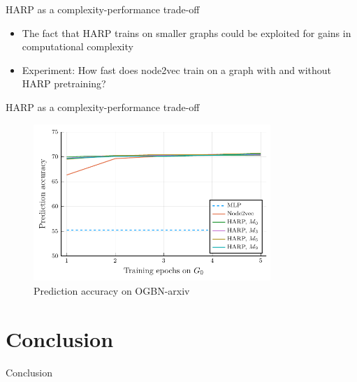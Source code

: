 \documentclass[10pt]{beamer}
\begin{document}
\begin{frame}{HARP as a complexity-performance trade-off}
	\begin{itemize}
		\item The fact that HARP trains on smaller graphs could be exploited for gains in computational complexity
		\item Experiment: How fast does node2vec train on a graph with and without HARP pretraining?
	\end{itemize}
\end{frame}

\begin{frame}{HARP as a complexity-performance trade-off}
	\begin{figure}
		\centering
		\includegraphics[width=0.8\textwidth]{images/steps_accur/steps_accur.pdf}
		\caption{Prediction accuracy on OGBN-arxiv}
	\end{figure}
\end{frame}

\section{Conclusion}

\begin{frame}{Conclusion}
	\centering
\end{frame}
\end{document}

